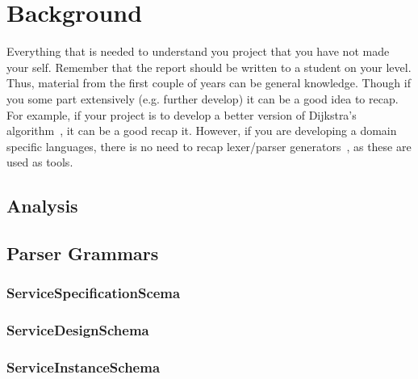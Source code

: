 \chapter{Background}
Everything that is needed to understand you project that you have not made your self. Remember that the report should be written to a student on your level. Thus, material from the first couple of years can be general knowledge. Though if you some part extensively (e.g. further develop) it can be a good idea to recap. For example, if your project is to develop a better version of Dijkstra's algorithm~, it can be a good recap it. However, if you are developing a domain specific languages, there is no need to recap lexer/parser generators~, as these are used as tools.

\section{Analysis}

\section{Parser Grammars}

\subsection{ServiceSpecificationScema}
\subsection{ServiceDesignSchema}
\subsection{ServiceInstanceSchema}
